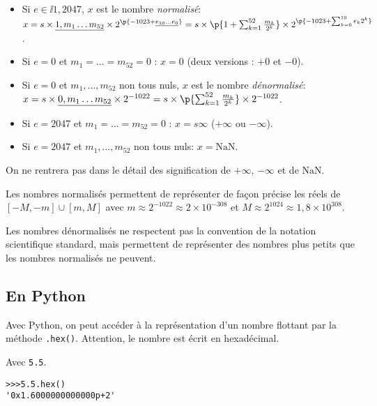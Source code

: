 \begin{itemize}
  \item Si $e\in\ii{1,2047}$, $x$ est le  nombre \emph{normalisé}:
$  x = s \times \underline{1,m_{1}\ldots m_{52}}\times
  2^{\p{-1023+\underline{e_{10}\ldots  e_{0}}}}
  = 
  s \times \p{1+\sum_{k=1}^{52} \frac{m_{k}}{2^{k}}}
  \times 2^{\p{-1023 + \sum_{k=0}^{10} e_{k}2^{k}}}
$.
\item Si $e = 0$ et $m_{1}=\dots=m_{52}=0$ : $x=0$ (deux
  versions : $+0$ et $-0$).

\item  Si $e = 0$ et $m_{1},\ldots,m_{52}$ non tous nuls, $x$ est le nombre
\emph{dénormalisé}:
$
  x = s \times \underline{0,m_{1}\ldots m_{52}}\times
  2^{-1022}
  = 
  s \times \p{\sum_{k=1}^{52} \frac{m_{k}}{2^{k}}}
  \times 2^{-1022}
$.
\item  Si $e= 2047$ et $m_{1}=\ldots= m_{52}=0$ : $x = s\infty$ ($+\infty$
ou $-\infty$).

\item  Si $e = 2047$ et $m_{1},\ldots, m_{52}$ non tous nuls: $x=\text{NaN}$.
\end{itemize}
\begin{remarque}
  On ne rentrera pas dans le détail des signification de $+\infty$, $-\infty$ et de $\text{NaN}$.
\end{remarque}


Les nombres normalisés permettent de représenter de façon précise les
réels de $[-M,-m]\cup [m, M]$ 
avec $ m \approx2^{-1022}\approx 2\times 10^{-308}$ et 
$M \approx 2^{1024}\approx 1,8 \times 10^{308}$.

Les nombres dénormalisés ne respectent pas la convention de la notation scientifique standard, mais permettent de représenter des nombres plus petits que les nombres normalisés ne peuvent. 



\subsection{En Python}

Avec Python, on peut accéder à la représentation d'un nombre flottant par la méthode \texttt{.hex()}. Attention, le nombre est écrit en hexadécimal. 

\begin{exemple}
  Avec \texttt{5.5}. 
\begin{lstlisting}
>>>5.5.hex()
'0x1.6000000000000p+2'
\end{lstlisting}
\end{exemple}


